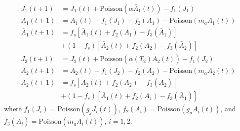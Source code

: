 \documentclass[12pt, table]{article}
\begin{document}
 \begin{align}
 J_1(t+1)&=  J_1(t)+\text{Poisson$\left(\alpha\bar{A}_1(t)\right)$}-f_1(J_1)\nonumber\\  
 A_1(t+1)&=  A_1(t)+f_1(J_1)-f_2(A_1)-\text{Poisson$\left(m_aA_1(t)\right)$}\\  
 \bar{A}_1(t+1)&=  f_s\left[\bar{A}_1(t)+f_2(A_1)-f_3(\bar{A}_1)\right]\nonumber\\&+(1-f_s)\left[\bar{A}_2(t)+f_2(A_2)-f_3(\bar{A}_2)\right]\nonumber\\
 J_2(t+1)&=  J_2(t)+\text{Poisson$\left(\alpha(T_2)\bar{A}_2(t)\right)$}-f_1(J_2)\nonumber\\  
 A_2(t+1)&=  A_2(t)+f_1(J_2)-f_2(A_2)-\text{Poisson$\left(m_aA_2(t)\right)$}\nonumber\\  
\bar{A}_2(t+1)&=  f_s\left[\bar{A}_2(t)+f_2(A_2)-f_3(\bar{A}_2)\right]\nonumber\\&+(1-f_s)\left[\bar{A}_1(t)+f_2(A_1)-f_3(\bar{A}_1)\right]\nonumber
\end{align}
where $f_1(J_i)=\text{Poisson$\left(g_jJ_i(t)\right)$}$,  $f_2(A_i)=\text{Poisson$\left(g_aA_i(t)\right)$}$,  and $f_3(\bar{A}_i)= \text{Poisson$\left(m_a\bar{A}_i(t)\right)$}$, $i=1,2.$
\end{document}
